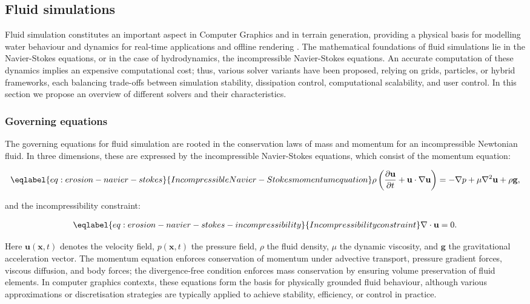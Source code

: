 
\subsection{Fluid simulations}

Fluid simulation constitutes an important aspect in Computer Graphics and in terrain generation, providing a physical basis for modelling water behaviour and dynamics for real-time applications and offline rendering \cite{Wang2024}. The mathematical foundations of fluid simulations lie in the Navier-Stokes equations, or in the case of hydrodynamics, the incompressible Navier-Stokes equations. An accurate computation of these dynamics implies an expensive computational cost; thus, various solver variants have been proposed, relying on grids, particles, or hybrid frameworks, each balancing trade-offs between simulation stability, dissipation control, computational scalability, and user control. In this section we propose an overview of different solvers and their characteristics.

\subsubsection{Governing equations}
The governing equations for fluid simulation are rooted in the conservation laws of mass and momentum for an incompressible Newtonian fluid. In three dimensions, these are expressed by the incompressible Navier-Stokes equations, which consist of the momentum equation:

\begin{align}
    \eqlabel{eq:erosion-navier-stokes}{Incompressible Navier-Stokes momentum equation}
    \rho \left(\frac{\partial \mathbf{u}}{\partial t} + \mathbf{u}\cdot\nabla\mathbf{u}\right) = -\nabla p + \mu \nabla^2 \mathbf{u} + \rho \mathbf{g},
\end{align}

and the incompressibility constraint:

\begin{align}
    \eqlabel{eq:erosion-navier-stokes-incompressibility}{Incompressibility constraint}
    \nabla\cdot\mathbf{u} = 0.
\end{align}

Here $\mathbf{u}(\mathbf{x},t)$ denotes the velocity field, $p(\mathbf{x},t)$ the pressure field, $\rho$ the fluid density, $\mu$ the dynamic viscosity, and $\mathbf{g}$ the gravitational acceleration vector. The momentum equation enforces conservation of momentum under advective transport, pressure gradient forces, viscous diffusion, and body forces; the divergence-free condition enforces mass conservation by ensuring volume preservation of fluid elements. In computer graphics contexts, these equations form the basis for physically grounded fluid behaviour, although various approximations or discretisation strategies are typically applied to achieve stability, efficiency, or control in practice.


